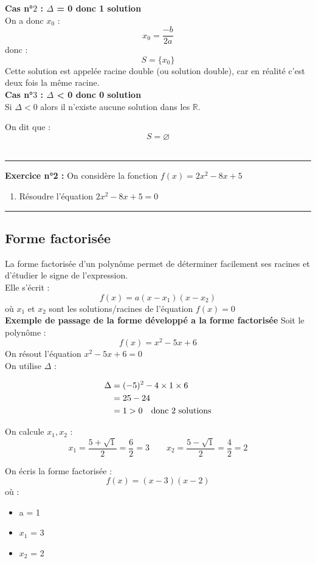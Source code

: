 \documentclass{article} %
\begin{document}
	
	\textbf{Cas n°$2$ : $\Delta$ = 0 donc 1 solution} \\
	On a donc $x_0$ :
	\[
	x_0 = \frac{-b}{2a}
	\]
	donc : 
	\[
	S = \{x_0\}
	\]
	Cette solution est appelée racine double (ou solution double), car en réalité c’est deux fois la même racine.\\
	
	\textbf{Cas n°$3$ : $\Delta$ < 0 donc 0 solution} \\
	Si $\Delta < 0$ alors il n'existe aucune solution dans les $\mathbb{R}$.
	
	\noindent On dit que :
	\[
		S = \varnothing
	\]\\
	
	\rule{\textwidth}{0.4pt}
	\noindent \textbf{Exercice n°2 :}
	On considère la fonction $f(x) = 2x^2 - 8x + 5$
	
	\begin{enumerate}
		\item Résoudre l'équation $2x^2 - 8x + 5 = 0$
	\end{enumerate}
	
	\rule{\textwidth}{0.4pt}
	\subsection{Forme factorisée}
	La forme factorisée d'un polynôme permet de déterminer facilement ses racines et d'étudier le signe de l'expression.\\
	Elle s'écrit : 
	\[
		f(x) = a(x-x_1)(x-x_2)
	\]
	où $x_1$ et $x_2$ sont les solutions/racines de l'équation $f(x) = 0$\\
	
	\textbf{Exemple de passage de la forme développé a la forme factorisée}
	Soit le polynôme :
	\[
		f(x) = x^2 - 5x + 6
	\]
	On résout l'équation $x^2 - 5x + 6 = 0$\\
	On utilise $\Delta$ :
	
	\begin{align*}
		\Delta &= (-5)^2 - 4 \times 1 \times 6 \\
		&= 25 - 24 \\
		&= 1 > 0 \text{\quad donc 2 solutions}
	\end{align*}
	
	\noindent On calcule $x_1, x_2$ : 
	\[
	x_1 = \frac{5 + \sqrt{1}}{2} = \frac{6}{2} = 3 \quad \quad x_2 = \frac{5 - \sqrt{1}}{2} = \frac{4}{2} = 2
	\]
	
	\noindent On écris la forme factorisée :
	\[
		f(x) = (x - 3)(x - 2)
	\]
	où :
	\begin{itemize}
		\item a = 1
		\item $x_1$ = 3
		\item $x_2$ = 2
	\end{itemize}
	
\end{document}
